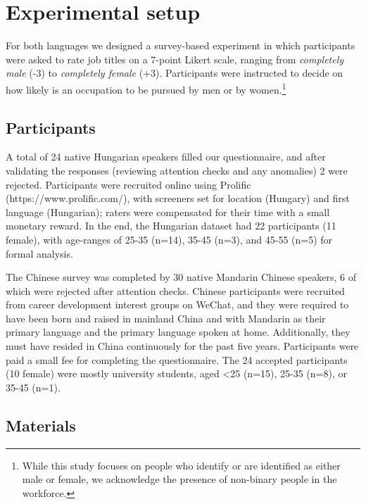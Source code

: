 \documentclass[10pt, a4paper]{article}
\begin{document}
\section{Experimental setup}\label{sec:experiment_setup}

For both languages we designed a survey-based experiment in which participants were asked to rate job titles on a 7-point Likert scale, ranging from \textit{completely male} (-3) to \textit{completely female} (+3). Participants were instructed to decide on how likely is an occupation to be pursued by men or by women.\footnote{While this study focuses on people who identify or are identified as either male or female, we acknowledge the presence of non-binary people in the workforce.}

\subsection{Participants}

A total of 24 native Hungarian speakers filled our questionnaire, and after validating the responses (reviewing attention checks and any anomalies) 2 were rejected. Participants were recruited online using Prolific (https://www.prolific.com/), with screeners set for location (Hungary) and first language (Hungarian); raters were compensated for their time with a small monetary reward. In the end, the Hungarian dataset had 22 participants (11 female), with age-ranges of 25-35 (n=14), 35-45 (n=3), and 45-55 (n=5) for formal analysis. 


The Chinese survey was completed by 30 native Mandarin Chinese speakers, 6 of which were rejected after attention checks. Chinese participants were recruited from career development interest groups on WeChat, and they were required to have been born and raised in mainland China and with Mandarin as their primary language and the primary language spoken at home. Additionally, they must have resided in China continuously for the past five years. Participants were paid a small fee for completing the questionnaire. The 24 accepted participants (10 female) were mostly university students, aged <25 (n=15), 25-35 (n=8), or 35-45 (n=1). 


\subsection{Materials}
\end{document}
